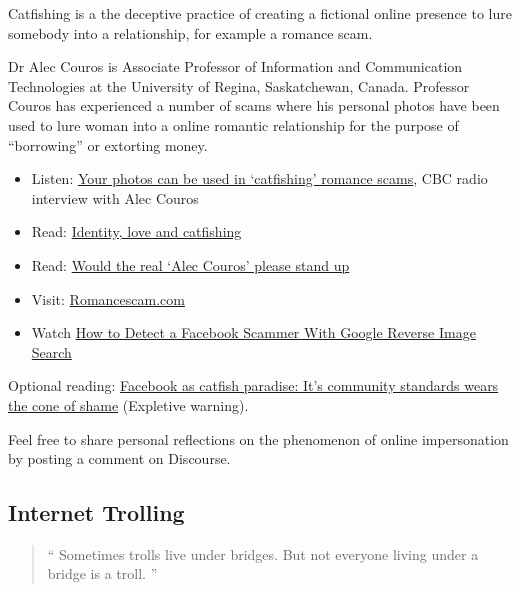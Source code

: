 \documentclass[
]{book}
\providecommand{\tightlist}{%
  \setlength{\itemsep}{0pt}\setlength{\parskip}{0pt}}
\theoremstyle{definition}
\theoremstyle{definition}
\theoremstyle{definition}
\theoremstyle{definition}
\theoremstyle{remark}
\begin{document}
\begin{reflect}
Catfishing is a the deceptive practice of creating a fictional online presence to lure somebody into a relationship, for example a romance scam.

Dr Alec Couros is Associate Professor of Information and Communication Technologies at the University of Regina, Saskatchewan, Canada. Professor Couros has experienced a number of scams where his personal photos have been used to lure woman into a online romantic relationship for the purpose of ``borrowing'' or extorting money.

\begin{itemize}
\tightlist
\item
  Listen: \href{https://www.cbc.ca/radio/spark/380-phantom-traffic-jams-catfishing-scams-and-smart-speakers-1.4482967/your-photos-can-be-used-in-catfishing-romance-scams-1.4482985}{Your photos can be used in `catfishing' romance scams}, CBC radio interview with Alec Couros\\
\item
  Read: \href{http://educationaltechnology.ca/2393/}{Identity, love and catfishing}\\
\item
  Read: \href{http://educationaltechnology.ca/2466/}{Would the real `Alec Couros' please stand up}\\
\item
  Visit: \href{https://romancescam.com/}{Romancescam.com}\\
\item
  Watch \href{https://www.youtube.com/watch?v=s6Q4U8DvJH8}{How to Detect a Facebook Scammer With Google Reverse Image Search}
\end{itemize}

Optional reading: \href{https://cogdogblog.com/2015/10/facebook-as-catfish-paradise-its-community-standards-wears-the-cone-of-shame/}{Facebook as catfish paradise: It's community standards wears the cone of shame} (Expletive warning).

Feel free to share personal reflections on the phenomenon of online impersonation by posting a comment on Discourse.
\end{reflect}

\hypertarget{internet-trolling}{%
\subsection{Internet Trolling}\label{internet-trolling}}

\begin{quote}
`` Sometimes trolls live under bridges. But not everyone living under a bridge is a troll. ''
\end{quote}
\end{document}
